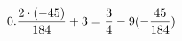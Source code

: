 \documentclass[preview]{standalone}
\begin{document}
\begin{align*}
\special{dvisvgm:raw <g id='unique000'>}0.\frac{2 \cdot (-45)}{184} + 3 = \frac{3}{4} - 9(- \frac{45}{184})\special{dvisvgm:raw </g>}
\end{align*}
\end{document}
